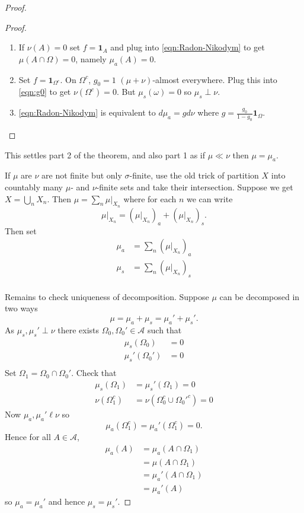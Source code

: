 \documentclass[a4paper]{article}
\begin{document}
\begin{proof}
  \begin{proof}\leavevmode
    \begin{enumerate}
    \item If \(\nu(A) = 0\) set \(f = \mathbf 1_A\) and plug into \eqref{eqn:Radon-Nikodym} to get \(\mu(A \cap \Omega) = 0\), namely \(\mu_a(A) = 0\).
    \item Set \(f = \mathbf 1_{\Omega^c}\). On \(\Omega^c\), \(g_0 = 1\) \((\mu + \nu)\)-almost everywhere. Plug this into \eqref{eqn:g0} to get \(\nu(\Omega^c) = 0\). But \(\mu_s(\omega) = 0\) so \(\mu_s \perp \nu\).
    \item \eqref{eqn:Radon-Nikodym} is equivalent to \(d\mu_a = gd\nu\) where \(g = \frac{g_0}{1 - g_0} \mathbf 1_\Omega\).
    \end{enumerate}
  \end{proof}

  This settles part 2 of the theorem, and also part 1 as if \(\mu \ll \nu\) then \(\mu = \mu_a\).

  If \(\mu\) are \(\nu\) are not finite but only \(\sigma\)-finite, use the old trick of partition \(X\) into countably many \(\mu\)- and \(\nu\)-finite sets and take their intersection. Suppose we get \(X = \bigcup_n X_n\). Then \(\mu = \sum_n \mu|_{X_n}\) where for each \(n\) we can write
  \[
    \mu|_{X_n} = (\mu|_{X_n})_a + (\mu|_{X_n})_s.
  \]
  Then set
  \begin{align*}
    \mu_a &= \sum_n (\mu|_{X_n})_a \\
    \mu_s &= \sum_n (\mu|_{X_n})_s \\
  \end{align*}

  Remains to check uniqueness of decomposition. Suppose \(\mu\) can be decomposed in two ways
  \[
    \mu = \mu_a + \mu_s = \mu_a' + \mu_s'.
  \]
  As \(\mu_s, \mu_s' \perp \nu\) there exists \(\Omega_0, \Omega_0' \in \mathcal A\) such that
  \begin{align*}
    \mu_s(\Omega_0) &= 0 \\
    \mu_s'(\Omega_0') &= 0 \\
  \end{align*}
  Set \(\Omega_1 = \Omega_0 \cap \Omega_0'\). Check that
  \begin{align*}
    \mu_s(\Omega_1) &= \mu_s'(\Omega_1) = 0 \\
    \nu(\Omega_1^c) &= \nu(\Omega_0^c \cup \Omega_0'^c) = 0
  \end{align*}
  Now \(\mu_a, \mu_a' \ell \nu\) so
  \[
    \mu_a(\Omega_1^c) = \mu_a'(\Omega_1^c) = 0.
  \]
  Hence for all \(A \in \mathcal A\),
  \begin{align*}
    \mu_a(A)
    &= \mu_a(A \cap \Omega_1) \\
    &= \mu(A \cap \Omega_1) \\
    &= \mu_a'(A \cap \Omega_1) \\
    &= \mu_a'(A)
  \end{align*}
  so \(\mu_a = \mu_a'\) and hence \(\mu_s = \mu_s'\).
\end{proof}
\end{document}
